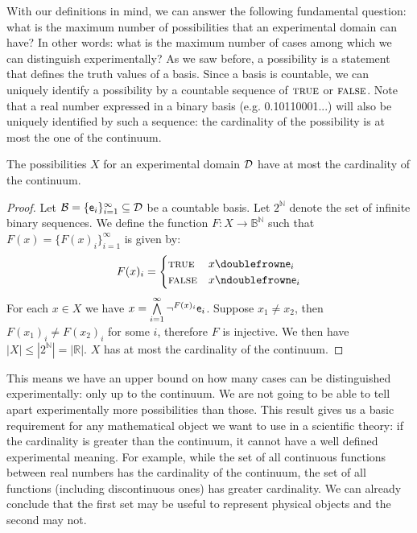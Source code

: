 \documentclass[11pt,letterpaper,fleqn]{memoir} %
\begin{document}
With our definitions in mind, we can answer the following fundamental question: what is the maximum number of possibilities that an experimental domain can have? In other words: what is the maximum number of cases among which we can distinguish experimentally? As we saw before, a possibility is a statement that defines the truth values of a basis. Since a basis is countable, we can uniquely identify a possibility by a countable sequence of $\TRUE$ or $\FALSE$. Note that a real number expressed in a binary basis (e.g. 0.10110001...) will also be uniquely identified by such a sequence: the cardinality of the possibility is at most the one of the continuum.

\begin{mathSection}
	\begin{thrm}
		The possibilities $X$ for an experimental domain $\edomain$ have at most the cardinality of the continuum.
	\end{thrm}
	
	\begin{proof}
		Let $\basis = \{\obs[e]_i\}_{i=1}^{\infty} \subseteq \edomain$ be a countable basis. Let $2^{\mathbb{N}}$ denote the set of infinite binary sequences. We define the function $F:X\to\mathbb{B}^{\mathbb{N}}$ such that $F(x) = \{F(x)_i\}_{i=1}^{\infty}$ is given by: 
		$$
		F(x)_i = 
		\begin{cases}
		\TRUE & x \comp \obs[e]_i \\
		\FALSE & x \ncomp \obs[e]_i
		\end{cases}
		$$
		For each $x \in X$ we have $x = \bigAND\limits_{i=1}^{\infty} \NOT^{F(x)_i} \obs[e]_i$. Suppose $x_1 \neq x_2$, then $F(x_1)_i \neq F(x_2)_i$ for some $i$, therefore $F$ is injective. We then have $|X| \leq |2^{\mathbb{N}}|=|\mathbb{R}|$. $X$ has at most the cardinality of the continuum.
	\end{proof}
\end{mathSection}

This means we have an upper bound on how many cases can be distinguished experimentally: only up to the continuum. We are not going to be able to tell apart experimentally more possibilities than those. This result gives us a basic requirement for any mathematical object we want to use in a scientific theory: if the cardinality is greater than the continuum, it cannot have a well defined experimental meaning. For example, while the set of all continuous functions between real numbers has the cardinality of the continuum, the set of all functions (including discontinuous ones) has greater cardinality. We can already conclude that the first set may be useful to represent physical objects and the second may not.
\end{document}
